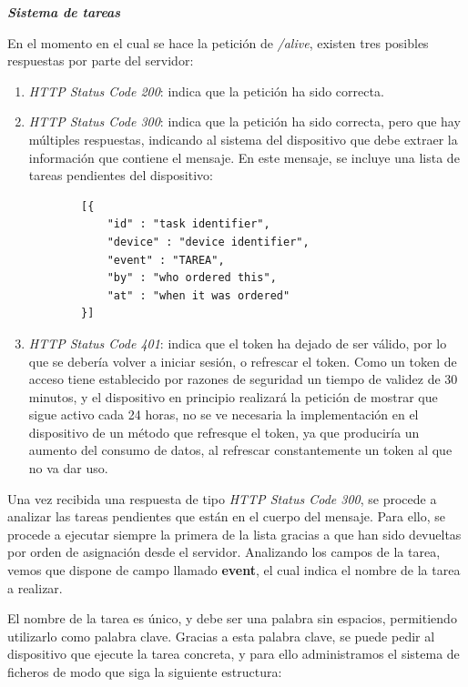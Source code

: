         \textit{\textbf{Sistema de tareas}}
        
        En el momento en el cual se hace la petición de \textit{/alive}, existen tres posibles respuestas por parte del servidor:
        \begin{enumerate}
            \item \textit{HTTP Status Code 200}: indica que la petición ha sido correcta.
            \item \textit{HTTP Status Code 300}: indica que la petición ha sido correcta, pero que hay múltiples respuestas, indicando al sistema del dispositivo que debe extraer la información que contiene el mensaje. En este mensaje, se incluye una lista de tareas pendientes del dispositivo:
            
        \begin{lstlisting}
        [{
            "id" : "task identifier",
            "device" : "device identifier",
            "event" : "TAREA",
            "by" : "who ordered this",
            "at" : "when it was ordered"
        }]
        \end{lstlisting}
        
        
            \item \textit{HTTP Status Code 401}: indica que el token ha dejado de ser válido, por lo que se debería volver a iniciar sesión, o refrescar el token. Como un token de acceso tiene establecido por razones de seguridad un tiempo de validez de 30 minutos, y el dispositivo en principio realizará la petición de mostrar que sigue activo cada 24 horas, no se ve necesaria la implementación en el dispositivo de un método que refresque el token, ya que produciría un aumento del consumo de datos, al refrescar constantemente un token al que no va dar uso.
            
        \end{enumerate}
        \label{seq:received300}
        
        Una vez recibida una respuesta de tipo \textit{HTTP Status Code 300}, se procede a analizar las tareas pendientes que están en el cuerpo del mensaje. Para ello, se procede a ejecutar siempre la primera de la lista gracias a que han sido devueltas por orden de asignación desde el servidor.
        Analizando los campos de la tarea, vemos que dispone de campo llamado \textbf{event}, el cual indica el nombre de la tarea a realizar.
        
        El nombre de la tarea es único, y debe ser una palabra sin espacios, permitiendo utilizarlo como palabra clave.
        Gracias a esta palabra clave, se puede pedir al dispositivo que ejecute la tarea concreta, y para ello administramos el sistema de ficheros de modo que siga la siguiente estructura:
        
